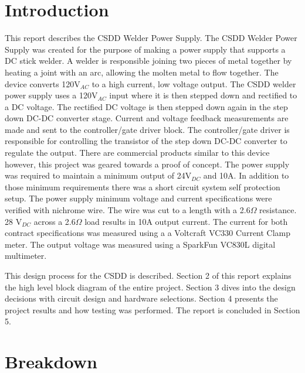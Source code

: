 \documentclass[11pt]{article}
\begin{document}
\newpage
\tableofcontents 
\listoffigures
\newpage 
\clearpage
{} %


\section{Introduction}

This report describes the CSDD Welder Power Supply. The CSDD Welder Power Supply was created for the purpose of making a power supply that supports a DC stick welder. A welder is responsible joining two pieces of metal together by heating a joint with an arc, allowing the molten metal to flow together. The device converts 120V$_{AC}$ to a high current, low voltage output. The CSDD welder power supply uses a 120V$_{AC}$ input where it is then stepped down and rectified to a DC voltage. The rectified DC voltage is then stepped down again in the step down DC-DC converter stage. Current and voltage feedback measurements are made and sent to the controller/gate driver block. The controller/gate driver is responsible for controlling the transistor of the step down DC-DC converter to regulate the output. There are commercial products similar to this device however, this project was geared towards a proof of concept. The power supply was required to maintain a minimum output of 24V$_{DC}$ and 10A. In addition to those minimum requirements there was a short circuit system self protection setup. The power supply minimum voltage and current specifications were verified with nichrome wire. The wire was cut to a length with a 2.6$\Omega$ resistance. 28 V$_{DC}$ across a 2.6$\Omega$ load results in 10A output current. The current for both contract specifications was measured using a a Voltcraft VC330 Current Clamp meter. The output voltage was measured using a SparkFun VC830L digital multimeter. 

This design process for the CSDD is described. Section 2 of this report explains the high level block diagram of the entire project. Section 3 dives into the design decisions with circuit design and hardware selections. Section 4 presents the project results and how testing was performed. The report is concluded in Section 5. 




\section{Breakdown}
\end{document}

